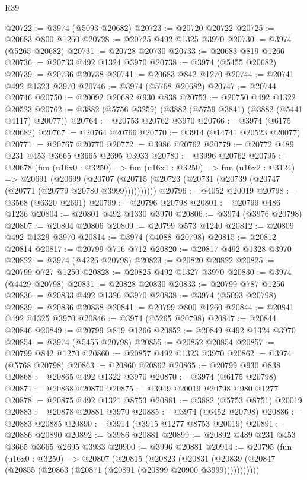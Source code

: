 \begin{lexlean}{R39}
\begin{coremodule}
@20722 := @3974 (@5093 @20682)
@20723 := @20720 @20722
@20725 := @20683 @800 @1260
@20728 := @20725 @492 @1325 @3970
@20730 := @3974 (@5265 @20682)
@20731 := @20728 @20730
@20733 := @20683 @819 @1266
@20736 := @20733 @492 @1324 @3970
@20738 := @3974 (@5455 @20682)
@20739 := @20736 @20738
@20741 := @20683 @842 @1270
@20744 := @20741 @492 @1323 @3970
@20746 := @3974 (@5768 @20682)
@20747 := @20744 @20746
@20750 := @20092 @20682 @930 @838
@20753 := @20750 @492 @1322 @20523
@20762 := @3882 (@5756 @3259) (@3882 (@5759 @3841) (@3882 (@5441 @4117) @20077))
@20764 := @20753 @20762 @3970
@20766 := @3974 (@6175 @20682)
@20767 := @20764 @20766
@20770 := @3914 (@14741 @20523 @20077)
@20771 := @20767 @20770
@20772 := @3986 @20762
@20779 := @20772 @489 @231 @453 @3665 @3665 @2695 @3933
@20780 := @3996 @20762
@20795 := @20678
    (fun (u16x0 : @3250) =>
    fun (u16x1 : @3250) =>
    fun (u16x2 : @3124) =>
    @20691
      (@20699 (@20707 (@20715 (@20723 (@20731 (@20739 (@20747 (@20771 (@20779 @20780 @3999))))))))))
@20796 := @4052 @20019
@20798 := @3568 (@6320 @2691)
@20799 := @20796 @20798
@20801 := @20799 @486 @1236
@20804 := @20801 @492 @1330 @3970
@20806 := @3974 (@3976 @20798)
@20807 := @20804 @20806
@20809 := @20799 @573 @1240
@20812 := @20809 @492 @1329 @3970
@20814 := @3974 (@4088 @20798)
@20815 := @20812 @20814
@20817 := @20799 @716 @712
@20820 := @20817 @492 @1328 @3970
@20822 := @3974 (@4226 @20798)
@20823 := @20820 @20822
@20825 := @20799 @727 @1250
@20828 := @20825 @492 @1327 @3970
@20830 := @3974 (@4429 @20798)
@20831 := @20828 @20830
@20833 := @20799 @787 @1256
@20836 := @20833 @492 @1326 @3970
@20838 := @3974 (@5093 @20798)
@20839 := @20836 @20838
@20841 := @20799 @800 @1260
@20844 := @20841 @492 @1325 @3970
@20846 := @3974 (@5265 @20798)
@20847 := @20844 @20846
@20849 := @20799 @819 @1266
@20852 := @20849 @492 @1324 @3970
@20854 := @3974 (@5455 @20798)
@20855 := @20852 @20854
@20857 := @20799 @842 @1270
@20860 := @20857 @492 @1323 @3970
@20862 := @3974 (@5768 @20798)
@20863 := @20860 @20862
@20865 := @20799 @930 @838
@20868 := @20865 @492 @1322 @3970
@20870 := @3974 (@6175 @20798)
@20871 := @20868 @20870
@20875 := @3949 @20019 @20798 @980 @1277
@20878 := @20875 @492 @1321 @8753
@20881 := @3882 (@5753 @8751) @20019
@20883 := @20878 @20881 @3970
@20885 := @3974 (@6452 @20798)
@20886 := @20883 @20885
@20890 := @3914 (@3915 @1277 @8753 @20019)
@20891 := @20886 @20890
@20892 := @3986 @20881
@20899 := @20892 @489 @231 @453 @3665 @3665 @2695 @3933
@20900 := @3996 @20881
@20914 := @20795
    (fun (u16x0 : @3250) =>
    @20807
      (@20815
        (@20823
          (@20831 (@20839 (@20847 (@20855 (@20863 (@20871 (@20891 (@20899 @20900 @3999)))))))))))

\end{coremodule}
\end{lexlean}
